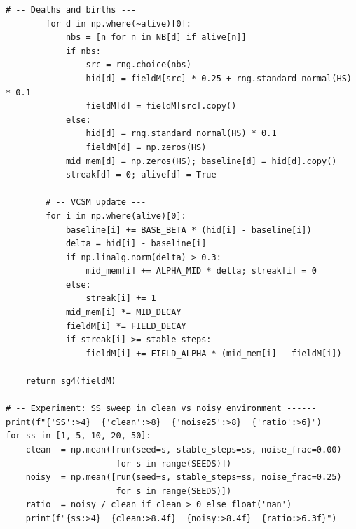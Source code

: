 \documentclass[11pt,twocolumn]{article}
\begin{document}
\begin{lstlisting}[caption={paper4\_gate\_repro.py}]
        # -- Deaths and births ---
        for d in np.where(~alive)[0]:
            nbs = [n for n in NB[d] if alive[n]]
            if nbs:
                src = rng.choice(nbs)
                hid[d] = fieldM[src] * 0.25 + rng.standard_normal(HS) * 0.1
                fieldM[d] = fieldM[src].copy()
            else:
                hid[d] = rng.standard_normal(HS) * 0.1
                fieldM[d] = np.zeros(HS)
            mid_mem[d] = np.zeros(HS); baseline[d] = hid[d].copy()
            streak[d] = 0; alive[d] = True

        # -- VCSM update ---
        for i in np.where(alive)[0]:
            baseline[i] += BASE_BETA * (hid[i] - baseline[i])
            delta = hid[i] - baseline[i]
            if np.linalg.norm(delta) > 0.3:
                mid_mem[i] += ALPHA_MID * delta; streak[i] = 0
            else:
                streak[i] += 1
            mid_mem[i] *= MID_DECAY
            fieldM[i] *= FIELD_DECAY
            if streak[i] >= stable_steps:
                fieldM[i] += FIELD_ALPHA * (mid_mem[i] - fieldM[i])

    return sg4(fieldM)

# -- Experiment: SS sweep in clean vs noisy environment ------
print(f"{'SS':>4}  {'clean':>8}  {'noise25':>8}  {'ratio':>6}")
for ss in [1, 5, 10, 20, 50]:
    clean  = np.mean([run(seed=s, stable_steps=ss, noise_frac=0.00)
                      for s in range(SEEDS)])
    noisy  = np.mean([run(seed=s, stable_steps=ss, noise_frac=0.25)
                      for s in range(SEEDS)])
    ratio  = noisy / clean if clean > 0 else float('nan')
    print(f"{ss:>4}  {clean:>8.4f}  {noisy:>8.4f}  {ratio:>6.3f}")
\end{lstlisting}
\end{document}
